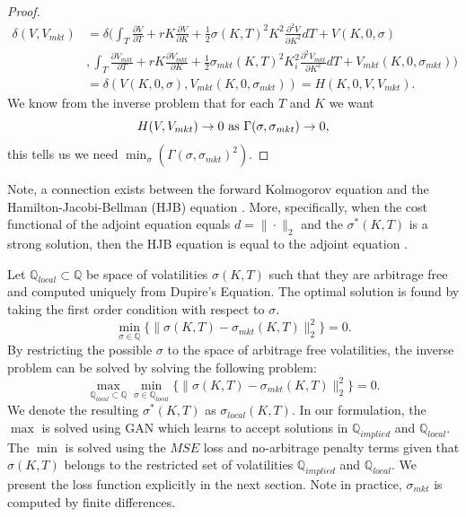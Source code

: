 \documentclass{article}
\theoremstyle{plain}%
\theoremstyle{definition}
\theoremstyle{remark}
\begin{document}
\begin{proof}
\begin{align*}
    \delta(V,V_{mkt}) &= \delta(\int_{T} \frac{\partial V}{\partial T}+rK\frac{\partial V}{\partial K} +\frac{1}{2}\sigma(K,T)^2K^2\frac{\partial^2 V}{\partial K^2}dT + V(K,0,\sigma)\\
    &,\int_{T} \frac{\partial V_{mkt}}{\partial T}+rK\frac{\partial V_{mkt}}{\partial K} +\frac{1}{2}\sigma_{mkt}(K,T)^2K_i^2\frac{\partial^2 V_{mkt}}{\partial K^2}dT + V_{mkt}(K,0,\sigma_{mkt}))\\
    &= \delta(V(K,0,\sigma),V_{mkt}(K,0,\sigma_{mkt})) = H(K,0,V,V_{mkt}).
\end{align*}
We know from the inverse problem that for each $T$ and $K$ we want 
\[
    H(V,V_{mkt}) \rightarrow 0\ \textnormal{as}\ \Gamma(\sigma,\sigma_{mkt}) \rightarrow 0,
\]
this tells us we need $\min_{\sigma}(\Gamma(\sigma,\sigma_{mkt})^2)$.
\end{proof}
Note, a connection exists between the forward Kolmogorov equation and the Hamilton-Jacobi-Bellman (HJB) equation \citep{annunziato-2014}. More, specifically, when the cost functional of the adjoint equation equals $d=\|\cdot\|_2$ and the $\sigma^*(K,T)$ is a strong solution, then the HJB equation is equal to the adjoint equation \citep{annunziato-2014}.

Let $\mathbb{Q}_{local} \subset \mathbb{Q}$ be space of volatilities $\sigma(K,T)$ such that they are arbitrage free and computed uniquely from Dupire's Equation. The optimal solution is found by taking the first order condition with respect to $\sigma$.
\[
    \min_{\sigma \in \mathbb{Q}}\{\|\sigma(K,T) - \sigma_{mkt}(K,T)\|_2^2\} = 0.
\]
By restricting the possible $\sigma$ to the space of arbitrage free volatilities, the inverse problem can be solved by solving the following problem:
\begin{equation}
    \max_{\mathbb{Q}_{local}\subset \mathbb{Q}}\min_{\sigma \in \mathbb{Q}_{local}}\{\|\sigma(K,T) - \sigma_{mkt}(K,T)\|_2^2\} = 0.
    \label{eq:GAN-minmax-loc}
\end{equation}
We denote the resulting $\sigma^*(K,T)$ as $\sigma_{local}(K,T)$. In our formulation, the $\max$ is solved using GAN which learns to accept solutions in $\mathbb{Q}_{implied}$ and $\mathbb{Q}_{local}$. The $\min$ is solved using the $MSE$ loss and no-arbitrage penalty terms given that $\sigma(K,T)$ belongs to the restricted set of volatilities $\mathbb{Q}_{implied}$ and $\mathbb{Q}_{local}$. We present the loss function explicitly in the next section. Note in practice, $\sigma_{mkt}$ is computed by finite differences.
\end{document}
